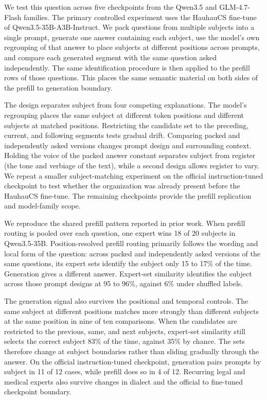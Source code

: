 \documentclass[10pt,twocolumn]{article}
\begin{document}
We test this question across five checkpoints from the Qwen3.5 and GLM-4.7-Flash families. The primary controlled experiment uses the HauhauCS fine-tune of Qwen3.5-35B-A3B-Instruct. We pack questions from multiple subjects into a single prompt, generate one answer containing each subject, use the model's own regrouping of that answer to place subjects at different positions across prompts, and compare each generated segment with the same question asked independently. The same identification procedure is then applied to the prefill rows of those questions. This places the same semantic material on both sides of the prefill to generation boundary.

The design separates subject from four competing explanations. The model's regrouping places the same subject at different token positions and different subjects at matched positions. Restricting the candidate set to the preceding, current, and following segments tests gradual drift. Comparing packed and independently asked versions changes prompt design and surrounding context. Holding the voice of the packed answer constant separates subject from register (the tone and verbiage of the text), while a second design allows register to vary. We repeat a smaller subject-matching experiment on the official instruction-tuned checkpoint to test whether the organization was already present before the HauhauCS fine-tune. The remaining checkpoints provide the prefill replication and model-family scope.

We reproduce the shared prefill pattern reported in prior work. When prefill routing is pooled over each question, one expert wins 18 of 20 subjects in Qwen3.5-35B. Position-resolved prefill routing primarily follows the wording and local form of the question: across packed and independently asked versions of the same questions, its expert sets identify the subject only 15 to 17\% of the time. Generation gives a different answer. Expert-set similarity identifies the subject across those prompt designs at 95 to 96\%, against 6\% under shuffled labels.

The generation signal also survives the positional and temporal controls. The same subject at different positions matches more strongly than different subjects at the same position in nine of ten comparisons. When the candidates are restricted to the previous, same, and next subjects, expert-set similarity still selects the correct subject 83\% of the time, against 35\% by chance. The sets therefore change at subject boundaries rather than sliding gradually through the answer. On the official instruction-tuned checkpoint, generation pairs prompts by subject in 11 of 12 cases, while prefill does so in 4 of 12. Recurring legal and medical experts also survive changes in dialect and the official to fine-tuned checkpoint boundary.
\end{document}
